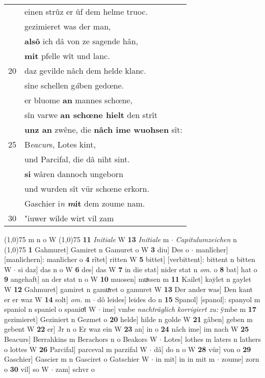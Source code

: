 \documentclass[8pt,a4paper,notitlepage]{article}
\begin{document}
\begin{table}[ht]
\begin{minipage}[t]{0.5\linewidth}
\begin{tabular}{rl}
 & einen strûz er ûf dem helme truoc.\\ 
 & gezimieret was der man,\\ 
 & \textbf{alsô} ich dâ von ze sagende hân,\\ 
 & \textbf{mit} pfelle wît und lanc.\\ 
20 & daz gevilde nâch dem helde klanc.\\ 
 & sîne schellen g\textit{â}ben gedœne.\\ 
 & er bluome \textbf{an} mannes schœne,\\ 
 & sîn varwe \textbf{an schœne hielt} den strît\\ 
 & \textbf{unz an} zwêne, die \textbf{nâch ime wuohsen} sît:\\ 
25 & B\textit{eacur}s, Lotes kint,\\ 
 & und Parcifal, die dâ niht sint.\\ 
 & \textbf{si} wâren dannoch ungeborn\\ 
 & und wurden sît vür schœne erkorn.\\ 
 & Gaschier i\textit{n} \textbf{\textit{m}it} dem zoume nam.\\ 
30 & "iuwer wilde wirt vil zam\\ 
\end{tabular}
\scriptsize
\line(1,0){75} \newline
m n o W \newline
\line(1,0){75} \newline
\textbf{11} \textit{Initiale} W  \textbf{13} \textit{Initiale} m   $\cdot$ \textit{Capitulumzeichen} n  \newline
\line(1,0){75} \newline
\textbf{1} Gahmuret] Gamiret n Gamuret o W \textbf{3} diu] Des o  $\cdot$ manlîcher] [manlichern]: manlicher o \textbf{4} rîtet] ritten W \textbf{5} bittet] [verbittent]: bittent n bitten W  $\cdot$ si daz] das n o W \textbf{6} des] das W \textbf{7} in die stat] nider stat n \textit{om.} o \textbf{8} bat] hat o \textbf{9} angehaft] an der stat n o W \textbf{10} muosen] muͯssen m \textbf{11} Kailet] kaẏlet n gaylet W \textbf{12} Gahmuret] gamiret n gamuͯret o gamuret W \textbf{13} Der ander was] Den kant er er waz W \textbf{14} solt] \textit{om.} m  $\cdot$ dô leides] leides do n \textbf{15} Spanol] [spanol]: spanyol m spaniol n spaniel o spanioͤl W  $\cdot$ ime] vmbe \textit{nachträglich korrigiert zu:} ÿmbe m \textbf{17} gezimieret] Geziniert n Gezmet o \textbf{20} helde] hilde n golde W \textbf{21} gâben] geben m gebent W \textbf{22} er] Jr n o Er waz ein W \textbf{23} an] in o \textbf{24} nâch ime] im nach W \textbf{25} Beacurs] Berrahkins m Berachors n o Beakors W  $\cdot$ Lotes] lothes m laters n lathers o lottes W \textbf{26} Parcifal] parceval m parzifal W  $\cdot$ dâ] do n o W \textbf{28} vür] von o \textbf{29} Gaschier] Gascier m n Gasciret o Gatschier W  $\cdot$ in mit] in in mit m  $\cdot$ zoume] zorn o \textbf{30} vil] so W  $\cdot$ zam] schvr o \newline
\end{minipage}
\end{table}
\end{document}

